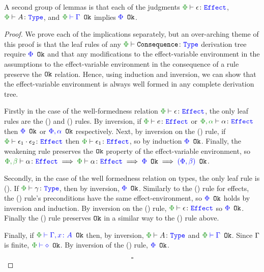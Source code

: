 \documentclass{Report}
\begin{document}
\begin{framed}
    \begin{lemma}
        A second group of lemmas is that each of the judgments  $\wellformedeffect{\P}{\e}$, $\wellformedtype{\P}{A}$, and $\oke{\P}{\G}$ implies ${\color{blue} \Phi} \texttt{ Ok}$.
    \end{lemma}
    
    \begin{proof}
        We prove each of the implications separately, but an over-arching theme of this proof is that the leaf rules of any $\wellformedtype{\P}{\texttt{Consequence}}$ derivation tree require ${\color{blue} \Phi} \texttt{ Ok}$ and that any modifications to the effect-variable environment in the assumptions to the effect-variable environment in the consequence of a rule preserve the $\texttt{Ok}$ relation. Hence, using induction and inversion, we can show that the effect-variable environment is always well formed in any complete derivation tree.
    
        Firstly in the case of the well-formedness relation $\wellformedeffect{\P}{\e}$, the only leaf rules are the (\textit{\eground}) and (\textit{\evar}) rules. By inversion, if $\wellformedeffect{\P}{e}$ or $\wellformedeffect{\P, \a}{\a}$ then ${\color{blue} \Phi} \texttt{ Ok}$ or ${\color{blue} \Phi, \alpha} \texttt{ Ok}$ respectively. Next, by inversion on the (\textit{\ecompose}) rule, if $\wellformedeffect{\P}{\e_1\dot\e_2}$ then $\wellformedeffect{\P}{\e_1}$, so by induction ${\color{blue} \Phi} \texttt{ Ok}$. Finally, the weakening rule preserves the $\texttt{Ok}$ property of the effect-variable environment, so $\wellformedeffect{\P, \b}{\a} \implies \wellformedeffect{\P}{\a} \implies \ok{\P} \implies \ok{(\P, \b)}$.
    
        Secondly, in the case of the well formedness relation on types, the only leaf rule is (\textit{\tground}). If $\wellformedtype{\P}{\g}$, then by inversion, ${\color{blue} \Phi} \texttt{ Ok}$. Similarly to the (\textit{\ecompose}) rule for effects, the (\textit{\tfun}) rule's preconditions have the same effect-environment, so ${\color{blue} \Phi} \texttt{ Ok}$ holds by inversion and induction. By inversion on the (\textit{\teffect}) rule, $\wellformedeffect{\P}{\e}$ so ${\color{blue} \Phi} \texttt{ Ok}$. Finally the (\textit{\tquant}) rule preserves $\texttt{Ok}$ in a similar way to the (\textit{\eweaken}) rule above.
    
        Finally, if $\oke{\P}{\gax}$ then, by inversion, $\wellformedtype{\P}{A}$  and $\oke{\P}{\G}$. Since $\Gamma$ is finite, $\oke{\P}{\nil}$. By inversion of the (\textit{\envnil}) rule, ${\color{blue} \Phi} \texttt{ Ok}$.

        $$\square$$
    \end{proof}
    
\end{framed}
\end{document}
